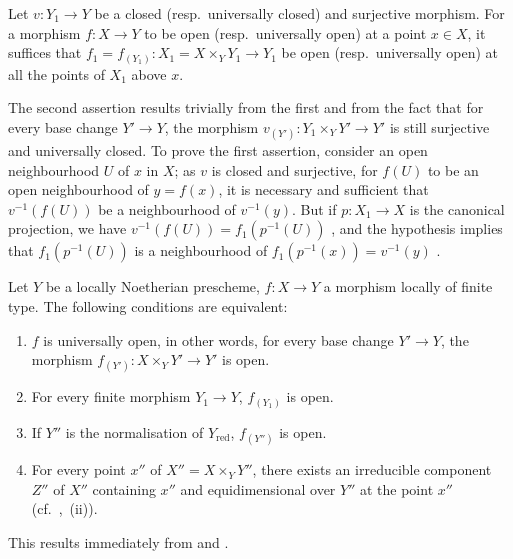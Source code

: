 \begin{lemma}[14.4.8.1]
\label{IV.14.4.8.1}
Let $v:Y_1\to Y$ be a closed (resp.\ universally closed) and surjective morphism.
For a morphism $f:X\to Y$ to be open (resp.\ universally open) at a point $x\in X$, it suffices that $f_1=f_{(Y_1)}:X_1=X\times_Y Y_1\to Y_1$ be open (resp.\ universally open) at all the points of $X_1$ above $x$.
\end{lemma}

The second assertion results trivially from the first and from the fact that for every base change $Y'\to Y$, the morphism $v_{(Y')}:Y_1\times_Y Y'\to Y'$ is still surjective and universally closed.
To prove the first assertion, consider
an open neighbourhood $U$ of $x$ in $X$; as $v$ is closed and surjective, for $f(U)$ to be an open neighbourhood of $y=f(x)$, it is necessary and sufficient that $v^{-1}(f(U))$ be a neighbourhood of $v^{-1}(y)$.
But if $p:X_1\to X$ is the canonical projection, we have $v^{-1}(f(U))=f_1(p^{-1}(U))$ , and the hypothesis implies that $f_1(p^{-1}(U))$ is a neighbourhood of $f_1(p^{-1}(x))=v^{-1}(y)$ .

\begin{corollary}[14.4.9]
\label{IV.14.4.9}
Let $Y$ be a locally Noetherian prescheme, $f:X\to Y$ a morphism locally of finite type.
The following conditions are equivalent:
\begin{enumerate}[label=\emph{\alph*)}]
  \item $f$ is universally open, in other words, for every base change $Y'\to Y$, the morphism $f_{(Y')}:X\times_Y Y'\to Y'$ is open.
  \item[\emph{a$'$)}] For every finite morphism $Y_1\to Y$, $f_{(Y_1)}$ is open.
  \item[\emph{a$''$)}] If $Y''$ is the normalisation of $Y_{\mathrm{red}}$, $f_{(Y'')}$ is open.
  \item For every point $x''$ of $X''=X\times_Y Y''$, there exists an irreducible component $Z''$ of $X''$ containing $x''$ and equidimensional over $Y''$ at the point $x''$ (cf.\ ,~(ii)).
\end{enumerate}
\end{corollary}

This results immediately from  and .

